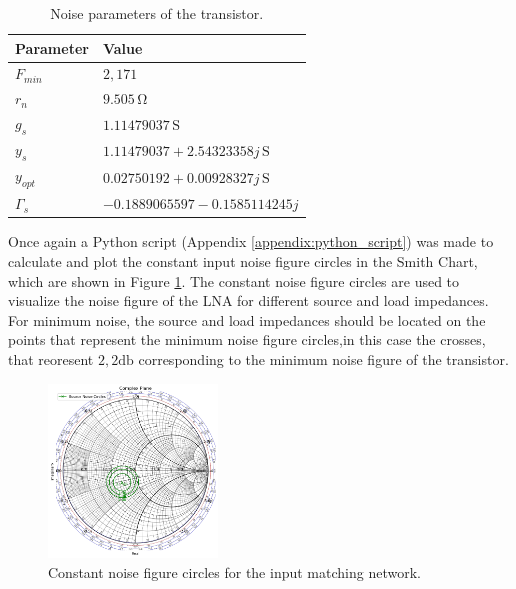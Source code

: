 \begin{table}[H]
    \centering
    \caption{Noise parameters of the transistor.}
    \begin{tabularx}{\textwidth}{>{\centering\arraybackslash}X >{\centering\arraybackslash}X}
        \toprule
        \textbf{Parameter} & \textbf{Value} \\
        \midrule
        $F_{min}$     & $2,171$ \\
        \midrule
        $r_n$     & $9.505\,\si{\ohm}$\\
        \midrule
        $g_s$   & $1.11479037\,\si{\siemens}$ \\
        \midrule
        $y_s$   & $1.11479037+2.54323358j\,\si{\siemens}$ \\
        \midrule
        $y_{opt}$     & $0.02750192+0.00928327j\,\si{\siemens}$\\
        \midrule
        $\Gamma_s$     & $-0.1889065597-0.1585114245j$\\
        \bottomrule
    \end{tabularx}
    \label{tab:NoiseParameters}
\end{table}

Once again a Python script (Appendix \ref{appendix:python_script}) was made to calculate and plot the constant input noise figure circles in the Smith Chart, which are shown in Figure \ref{fig:ConstantNoiseCircles}. The constant noise figure circles are used to visualize the noise figure of the LNA for different source and load impedances. For minimum noise, the source and load impedances should be located on the points that represent the minimum noise figure circles,in this case the crosses, that reoresent $2,2 \si{\decibel}$ corresponding to the minimum noise figure of the transistor.

\begin{figure}[H]
    \centering
    \includegraphics[width=0.4\textwidth]{Images/ConstantNoiseCircles.png}
    \caption{Constant noise figure circles for the input matching network.}
    \label{fig:ConstantNoiseCircles}
\end{figure}    

